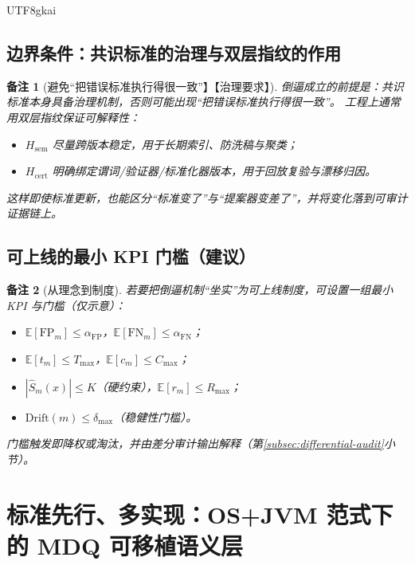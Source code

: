 \documentclass[12pt]{article}
\newtheorem{remark}{备注}[section]
\begin{document}
\begin{CJK*}{UTF8}{gkai}
\subsection{边界条件：共识标准的治理与双层指纹的作用}
\label{subsec:governance-boundary}

\begin{remark}[避免“把错误标准执行得很一致”】【治理要求】]
倒逼成立的前提是：共识标准本身具备治理机制，否则可能出现“把错误标准执行得很一致”。
工程上通常用双层指纹保证可解释性：
\begin{itemize}
  \item $H_{\mathrm{sem}}$ 尽量跨版本稳定，用于长期索引、防洗稿与聚类；
  \item $H_{\mathrm{cert}}$ 明确绑定谓词/验证器/标准化器版本，用于回放复验与漂移归因。
\end{itemize}
这样即使标准更新，也能区分“标准变了”与“提案器变差了”，并将变化落到可审计证据链上。
\end{remark}

\subsection{可上线的最小 KPI 门槛（建议）}
\label{subsec:min-kpi-gates}

\begin{remark}[从理念到制度]
若要把倒逼机制“坐实”为可上线制度，可设置一组最小 KPI 与门槛（仅示意）：
\begin{itemize}
  \item $\mathbb{E}[\mathrm{FP}_m]\le \alpha_{\mathrm{FP}}$，$\mathbb{E}[\mathrm{FN}_m]\le \alpha_{\mathrm{FN}}$；
  \item $\mathbb{E}[t_m]\le T_{\max}$，$\mathbb{E}[c_m]\le C_{\max}$；
  \item $|\widehat{S}_m(x)|\le K$（硬约束），$\mathbb{E}[r_m]\le R_{\max}$；
  \item $\mathrm{Drift}(m)\le \delta_{\max}$（稳健性门槛）。
\end{itemize}
门槛触发即降权或淘汰，并由差分审计输出解释（第\ref{subsec:differential-audit}小节）。
\end{remark}

\clearpage

\section{标准先行、多实现：OS+JVM 范式下的 MDQ 可移植语义层}
\label{sec:os-jvm-paradigm}


\end{CJK*}
\end{document}
